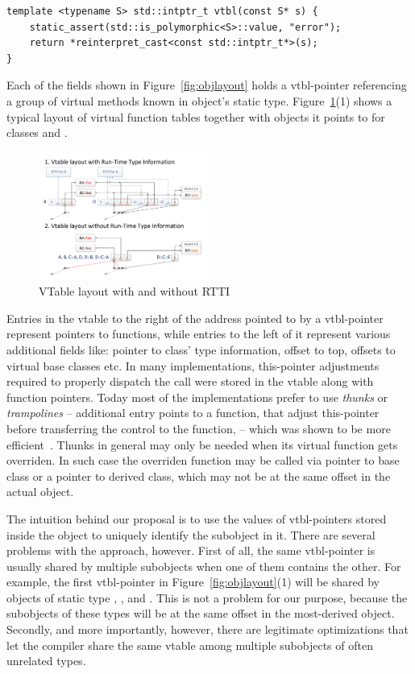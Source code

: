 \begin{lstlisting}
template <typename S> std::intptr_t vtbl(const S* s) {
    static_assert(std::is_polymorphic<S>::value, "error");
    return *reinterpret_cast<const std::intptr_t*>(s);
}
\end{lstlisting}

\noindent
Each of the  fields shown in Figure~\ref{fig:objlayout} holds a 
vtbl-pointer referencing a group of virtual methods known in object's static 
type. Figure~\ref{fig:vtbl}(1) shows a typical layout of virtual function tables 
together with objects it points to for classes  and .

\begin{figure}[htbp]
  \centering
    \includegraphics[width=0.49\textwidth]{v-table.pdf}
  \caption{VTable layout with and without RTTI}
  \label{fig:vtbl}
\end{figure}

Entries in the vtable to the right of the address pointed to by a vtbl-pointer 
represent pointers to functions, while entries to the left of it represent 
various additional fields like: pointer to class' type information, offset to 
top, offsets to virtual base classes etc. In many implementations, this-pointer 
adjustments required to properly dispatch the call were stored in the vtable 
along with function pointers. Today most of the implementations prefer to use 
\emph{thunks} or \emph{trampolines} -- additional entry points to a function, 
that adjust this-pointer before transferring the control to the function, -- 
which was shown to be more efficient~\cite{Driesen96}. Thunks in general may only be 
needed when its virtual function gets overriden. In such case the overriden 
function may be called via pointer to base class or a pointer to derived class, 
which may not be at the same offset in the actual object.

The intuition behind our proposal is to use the values of vtbl-pointers stored 
inside the object to uniquely identify the subobject in it. There are several 
problems with the approach, however. First of all, the same vtbl-pointer is 
usually shared by multiple subobjects when one of them contains the other. For 
example, the first vtbl-pointer in Figure~\ref{fig:objlayout}(1) will be shared 
by objects of static type , ,  and . This is 
not a problem for our purpose, because the subobjects of these types will be at 
the same offset in the most-derived object. Secondly, and more importantly, 
however, there are legitimate optimizations that let the compiler share the same 
vtable among multiple subobjects of often unrelated types.

